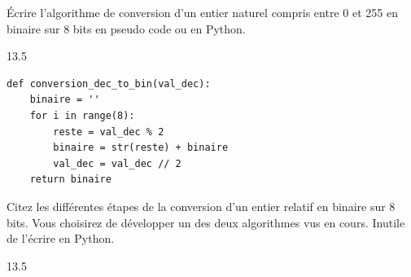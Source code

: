\documentclass[a4paper,10pt]{report}
\def\ptsexoB{2}
\def\ptsexoC{2}
\begin{document}
\begin{minipage}{0.49\linewidth}
    \exods{\ptsexoB}

 \'Ecrire l'algorithme de conversion d'un entier naturel compris entre 0 et 255 en binaire sur 8 bits en pseudo code ou en Python.

 \begin{answer}{1}{3.5} 
    \begin{verbatim}
def conversion_dec_to_bin(val_dec):
    binaire = ''
    for i in range(8):
        reste = val_dec % 2
        binaire = str(reste) + binaire
        val_dec = val_dec // 2
    return binaire
    \end{verbatim}   
\end{answer}
\end{minipage}\hfill{}
\begin{minipage}{0.49\linewidth}
    \exods{\ptsexoC}

    Citez les différentes étapes de la conversion d'un entier relatif en binaire sur 8 bits. Vous choisirez de développer un des deux algorithmes vus en cours. Inutile de l'écrire en Python.
    
    \begin{answer}{1}{3.5} 
    \begin{verbatim}
    \end{verbatim}   
\end{answer}
\end{minipage}
\end{document}
